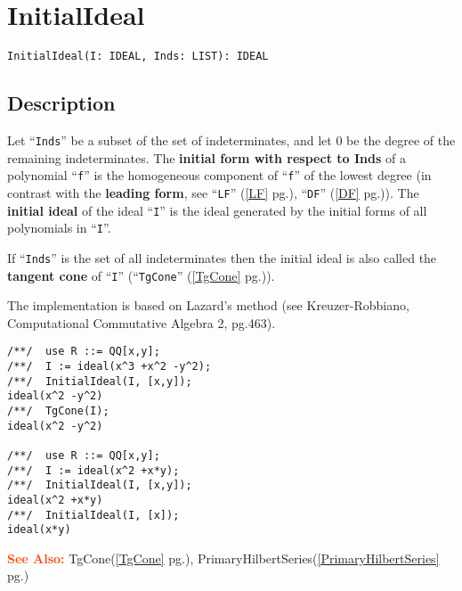\documentclass[a4paper]{mybook}
\newenvironment{command}{}{} %
\newcommand\SeeAlso{\par\textcolor{OrangeRed}{\textbf{\large See Also: }}}
\begin{document}
\section{InitialIdeal}
\label{InitialIdeal}
\begin{command} %


\begin{Verbatim}[label=syntax, rulecolor=\color{MidnightBlue},
frame=single]
InitialIdeal(I: IDEAL, Inds: LIST): IDEAL
\end{Verbatim}


\subsection*{Description}

Let ``\verb&Inds&'' be a subset of the set of indeterminates,
and let 0 be the degree of the remaining indeterminates.
The \textbf{initial form with respect to Inds} of a polynomial ``\verb&f&'' 
is the homogeneous component of ``\verb&f&'' of the lowest degree
(in contrast with the \textbf{leading form}, see ``\verb&LF&'' (\ref{LF} pg.\pageref{LF}), ``\verb&DF&'' (\ref{DF} pg.\pageref{DF})).
The \textbf{initial ideal} of the ideal ``\verb&I&'' is the ideal
generated by the initial forms of all polynomials in ``\verb&I&''.
\par 
If ``\verb&Inds&'' is the set of all indeterminates then the initial ideal 
is also called the \textbf{tangent cone} of ``\verb&I&'' (``\verb&TgCone&'' (\ref{TgCone} pg.\pageref{TgCone})).
\par 
The implementation is based on Lazard's method
(see Kreuzer-Robbiano, Computational Commutative Algebra 2, pg.463).
\begin{Verbatim}[label=example, rulecolor=\color{PineGreen}, frame=single]
/**/  use R ::= QQ[x,y];
/**/  I := ideal(x^3 +x^2 -y^2);
/**/  InitialIdeal(I, [x,y]);
ideal(x^2 -y^2)
/**/  TgCone(I);
ideal(x^2 -y^2)

/**/  use R ::= QQ[x,y];
/**/  I := ideal(x^2 +x*y);
/**/  InitialIdeal(I, [x,y]);
ideal(x^2 +x*y)
/**/  InitialIdeal(I, [x]);
ideal(x*y)
\end{Verbatim}


\SeeAlso %
  TgCone(\ref{TgCone} pg.\pageref{TgCone}), 
    PrimaryHilbertSeries(\ref{PrimaryHilbertSeries} pg.\pageref{PrimaryHilbertSeries})
\end{command} %
\end{document}
